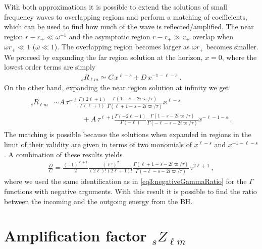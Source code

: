 With both approximations it is possible to extend the solutions of small frequency waves to overlapping regions and perform a matching of coefficients, which can be used to find how much of the wave is reflected/amplified.
The near region $r-r_{+}\ll \omega^{-1}$ and the asymptotic region $r-r_{+}\gg r_{+}$ overlap when $\omega r_{+} \ll 1$ ($\bar{\omega}\ll 1$). The overlapping region becomes larger as $\omega r_{+}$ becomes smaller.
We proceed by expanding the far region solution  at the horizon, $x=0$, where the lowest order terms are simply
\begin{align}
    {}_{s}R_{\ell m} \simeq C \, x^{\ell-s} + D \, x^{-1-\ell-s} ~.
\end{align}
On the other hand, expanding the near region solution  at infinity we get
\begin{align}
    \begin{split}
        {}_{s}R_{\ell m} &\sim A \, \tau^{-\ell} \frac{ \Gamma(2\ell+1)}{\Gamma(\ell+1)} \frac{\Gamma(1-s - 2 i \varpi/\tau)}{\Gamma(\ell+1 - s - 2 i \varpi/\tau)} x^{\ell-s} \\
        &\qquad\qquad + A \, \tau^{\ell+1} \frac{\Gamma(-2\ell-1)}{\Gamma(-\ell)} \frac{\Gamma(1 - s - 2 i \varpi/\tau)}{ \Gamma(-\ell - s - 2 i \varpi/\tau)} x^{-\ell-1-s} ~.
    \end{split}
\end{align}
The matching is possible because the solutions when expanded in regions in the limit of their validity are given in terms of two monomials of $x^{\ell-s}$ and $x^{-1-\ell-s}$.
A combination of these results yields
\begin{align}
    \frac{D}{C} = \frac{(-1)^{\ell+1}}{2} \frac{(\ell !)^2}{(2\ell)! (2\ell+1)!} \frac{\Gamma(\ell+1 - s - 2 i \varpi/\tau)}{\Gamma(-\ell - s - 2 i \varpi/\tau)} \, \tau^{2\ell+1} ~,
\end{align}
where we used the same identification as in \eqref{eq3:negativeGammaRatio} for the $\Gamma$ functions with negative arguments.
With this result it is possible to find the ratio between the incoming and the outgoing energy from the BH.


\section{Amplification factor ${}_{s}Z_{\ell m}$}


